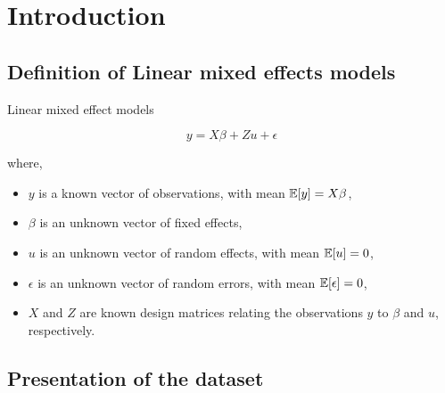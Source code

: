 \documentclass[unknownkeysallowed]{beamer}
\begin{document}
\section{Introduction}
\label{sec:Introduction}

\subsection{Definition of Linear mixed effects models}
\label{sub:Definition of Linear mixed effects models}

\begin{frame}{Linear mixed effect models}

{\[y = X \beta + Z u + \epsilon\]}

\medskip

where,
\begin{itemize}
    \item $y$ is  a known vector of observations, with mean $\mathbb{E}[y]=X \beta$,
    \item $\beta$ is an unknown vector of fixed effects,
    \item $u$ is an unknown vector of random effects, with mean $\mathbb{E}[u] = 0$,
    \item $\epsilon$ is an unknown vector of random errors, with mean $\mathbb{E}[\epsilon]=0$,
    \item $X$ and $Z$ are known design matrices relating the observations $y$ to $\beta$ and $u$,  respectively.
\end{itemize}



\end{frame}

\subsection{Presentation of the dataset}
\label{sub:Presentation of the dataset}
\end{document}
